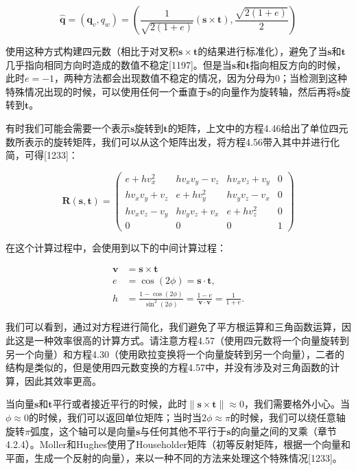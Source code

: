 \documentclass[
  paper=a4,
  ,captions=tableheading
]{scrartcl}
\begin{document}
\[
  \hat{\mathbf{q}}=
  \left(\mathbf{q}_{v}, q_{w}\right)
  =\left(
  \frac{1}{\sqrt{2(1+e)}}(\mathbf{s} \times \mathbf{t}),
  \frac{\sqrt{2(1+e)}}{2}
  \right)
  \tag{4.56}
\]

使用这种方式构建四元数（相比于对叉积\(\mathbf{s} \times \mathbf{t}\)的结果进行标准化），避免了当\(\mathbf{s}\)和\(\mathbf{t}\)几乎指向相同方向时造成的数值不稳定{[}1197{]}。但是当\(\mathbf{s}\)和\(\mathbf{t}\)指向相反方向的时候，此时\(e=-1\)，两种方法都会出现数值不稳定的情况，因为分母为0；当检测到这种特殊情况出现的时候，可以使用任何一个垂直于\(\mathbf{s}\)的向量作为旋转轴，然后再将\(\mathbf{s}\)旋转到\(\mathbf{t}\)。

有时我们可能会需要一个表示\(\mathbf{s}\)旋转到\(\mathbf{t}\)的矩阵，上文中的方程4.46给出了单位四元数所表示的旋转矩阵，我们可以从这个矩阵出发，将方程4.56带入其中并进行化简，可得{[}1233{]}：

\[
  \mathbf{R}(\mathbf{s}, \mathbf{t})=\left(\begin{array}{cccc}e+h v_{x}^{2} & h v_{x} v_{y}-v_{z} & h v_{x} v_{z}+v_{y} & 0 \\ h v_{x} v_{y}+v_{z} & e+h v_{y}^{2} & h v_{y} v_{z}-v_{x} & 0 \\ h v_{x} v_{z}-v_{y} & h v_{y} v_{z}+v_{x} & e+h v_{z}^{2} & 0 \\ 0 & 0 & 0 & 1\end{array}\right)
  \tag{4.57}
\]

在这个计算过程中，会使用到以下的中间计算过程：

\[
  \begin{aligned}
    \mathbf{v} & =\mathbf{s} \times \mathbf{t}               \\
    e          & =\cos (2 \phi)=\mathbf{s} \cdot \mathbf{t}, \\
    h          &
    =\frac{1-\cos (2 \phi)}{\sin ^{2}(2 \phi)}
    =\frac{1-e}{\mathbf{v} \cdot \mathbf{v}}
    =\frac{1}{1+e} .
  \end{aligned}
  \tag{4.58}
\]

我们可以看到，通过对方程进行简化，我们避免了平方根运算和三角函数运算，因此这是一种效率很高的计算方式。请注意方程4.57（使用四元数将一个向量旋转到另一个向量）和方程4.30（使用欧拉变换将一个向量旋转到另一个向量），二者的结构是类似的，但是使用四元数变换的方程4.57中，并没有涉及对三角函数的计算，因此其效率更高。

当向量\(\mathbf{s}\)和\(\mathbf{t}\)平行或者接近平行的时候，此时\(\|\mathbf{s} \times \mathbf{t}\| \approx 0\)，我们需要格外小心。当\(\phi \approx 0\)的时候，我们可以返回单位矩阵；当时当\(2 \phi \approx \pi\)的时候，我们可以绕任意轴旋转\(\pi\)弧度，这个轴可以是向量\(\mathbf{s}\)与任何其他不平行于\(\mathbf{s}\)的向量之间的叉乘（章节4.2.4）。Moller和Hughes使用了Householder矩阵（初等反射矩阵，根据一个向量和平面，生成一个反射的向量），来以一种不同的方法来处理这个特殊情况{[}1233{]}。
\end{document}
